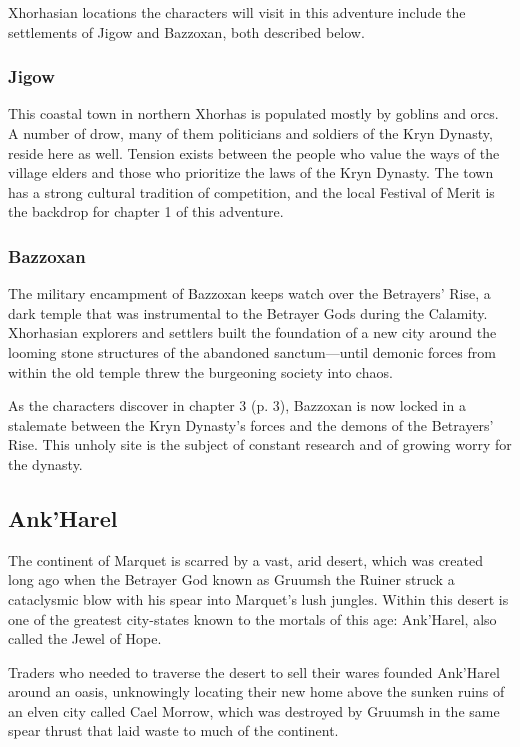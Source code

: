 \documentclass[letterpaper, 11pt, bg=full, twocolumn]{dndbook}
\begin{document}
Xhorhasian locations the characters will visit in this adventure include the settlements of Jigow and Bazzoxan, both described below.

\subsubsection{Jigow}

This coastal town in northern Xhorhas is populated mostly by goblins and orcs. A number of drow, many of them politicians and soldiers of the Kryn Dynasty, reside here as well. Tension exists between the people who value the ways of the village elders and those who prioritize the laws of the Kryn Dynasty. The town has a strong cultural tradition of competition, and the local Festival of Merit is the backdrop for chapter 1 of this adventure.

\subsubsection{Bazzoxan}

The military encampment of Bazzoxan keeps watch over the Betrayers' Rise, a dark temple that was instrumental to the Betrayer Gods during the Calamity. Xhorhasian explorers and settlers built the foundation of a new city around the looming stone structures of the abandoned sanctum---until demonic forces from within the old temple threw the burgeoning society into chaos.

As the characters discover in chapter 3 (p. 3), Bazzoxan is now locked in a stalemate between the Kryn Dynasty's forces and the demons of the Betrayers' Rise. This unholy site is the subject of constant research and of growing worry for the dynasty.

\subsection{Ank'Harel}

The continent of Marquet is scarred by a vast, arid desert, which was created long ago when the Betrayer God known as Gruumsh the Ruiner struck a cataclysmic blow with his spear into Marquet's lush jungles. Within this desert is one of the greatest city-states known to the mortals of this age: Ank'Harel, also called the Jewel of Hope.

Traders who needed to traverse the desert to sell their wares founded Ank'Harel around an oasis, unknowingly locating their new home above the sunken ruins of an elven city called Cael Morrow, which was destroyed by Gruumsh in the same spear thrust that laid waste to much of the continent.
\end{document}
